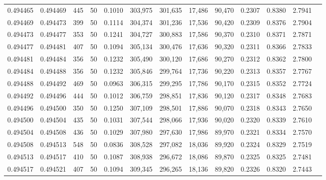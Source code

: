 \begin{tabular}{rrrrrrrrrrrrr}
0.494465 & 0.494469 &   445 &  50 &                                     0.1010 & 303,975 & 301,635 &  17,486 &  90,470 & 0.2307 & 0.8380 & 2.7941 \\
0.494469 & 0.494473 &   399 &  50 &                                     0.1114 & 304,374 & 301,236 &  17,536 &  90,420 & 0.2309 & 0.8376 & 2.7904 \\
0.494473 & 0.494477 &   353 &  50 &                                     0.1241 & 304,727 & 300,883 &  17,586 &  90,370 & 0.2310 & 0.8371 & 2.7871 \\
0.494477 & 0.494481 &   407 &  50 &                                     0.1094 & 305,134 & 300,476 &  17,636 &  90,320 & 0.2311 & 0.8366 & 2.7833 \\
0.494481 & 0.494484 &   356 &  50 &                                     0.1232 & 305,490 & 300,120 &  17,686 &  90,270 & 0.2312 & 0.8362 & 2.7800 \\
0.494484 & 0.494488 &   356 &  50 &                                     0.1232 & 305,846 & 299,764 &  17,736 &  90,220 & 0.2313 & 0.8357 & 2.7767 \\
0.494488 & 0.494492 &   469 &  50 &                                     0.0963 & 306,315 & 299,295 &  17,786 &  90,170 & 0.2315 & 0.8352 & 2.7724 \\
0.494492 & 0.494496 &   444 &  50 &                                     0.1012 & 306,759 & 298,851 &  17,836 &  90,120 & 0.2317 & 0.8348 & 2.7683 \\
0.494496 & 0.494500 &   350 &  50 &                                     0.1250 & 307,109 & 298,501 &  17,886 &  90,070 & 0.2318 & 0.8343 & 2.7650 \\
0.494500 & 0.494504 &   435 &  50 &                                     0.1031 & 307,544 & 298,066 &  17,936 &  90,020 & 0.2320 & 0.8339 & 2.7610 \\
0.494504 & 0.494508 &   436 &  50 &                                     0.1029 & 307,980 & 297,630 &  17,986 &  89,970 & 0.2321 & 0.8334 & 2.7570 \\
0.494508 & 0.494513 &   548 &  50 &                                     0.0836 & 308,528 & 297,082 &  18,036 &  89,920 & 0.2324 & 0.8329 & 2.7519 \\
0.494513 & 0.494517 &   410 &  50 &                                     0.1087 & 308,938 & 296,672 &  18,086 &  89,870 & 0.2325 & 0.8325 & 2.7481 \\
0.494517 & 0.494521 &   407 &  50 &                                     0.1094 & 309,345 & 296,265 &  18,136 &  89,820 & 0.2326 & 0.8320 & 2.7443 \\

\end{tabular}
